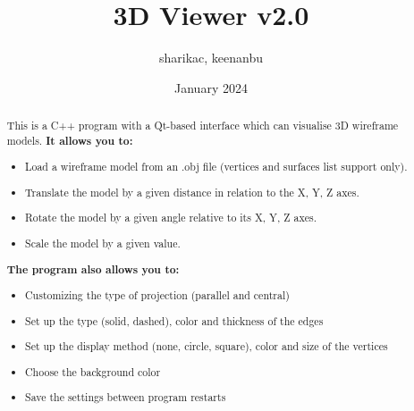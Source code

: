 \documentclass[a4paper, 12pt]{article}
\title{3D Viewer v2.0}
\author{sharikac, keenanbu}
\date{January 2024}
\begin{document}
\maketitle
\newpage
\begin{abstract}
\large This is a C++ program with a Qt-based interface which can visualise 3D wireframe models.
\newpage
{\bf \large It allows you to:}
\begin{itemize}
\item \parskip 3mm Load a wireframe model from an .obj file (vertices and surfaces list support only).
\item Translate the model by a given distance in relation to the X, Y, Z axes.
\item Rotate the model by a given angle relative to its X, Y, Z axes.
\item Scale the model by a given value.
\end{itemize}

{\bf \large \parskip 10mm The program also allows you to:}
\begin{itemize}
\item \parskip 3mm Customizing the type of projection (parallel and central)
\item Set up the type (solid, dashed), color and thickness of the edges
\item Set up the display method (none, circle, square), color and size of the vertices
\item Choose the background color
\item Save the settings between program restarts
\end{itemize}


\end{abstract}
\end{document}
